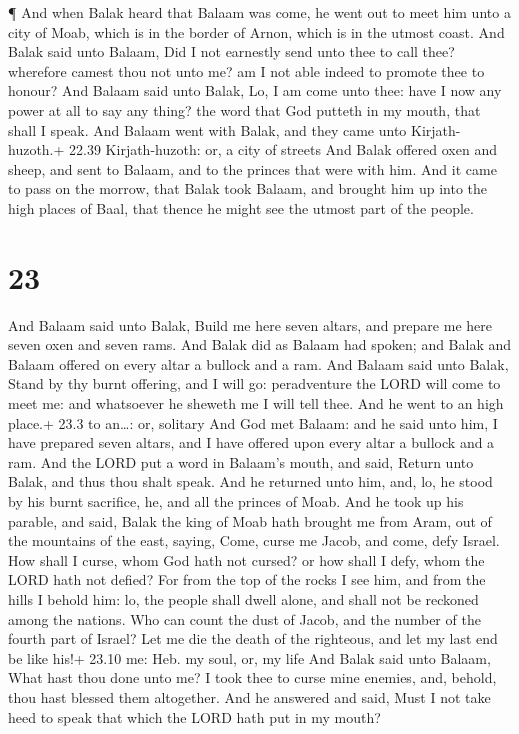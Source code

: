  ¶ And when Balak heard that Balaam was come, he went out
to meet him unto a city of Moab, which is in the border of Arnon, which
is in the utmost coast.  And Balak said unto Balaam, Did I
not earnestly send unto thee to call thee? wherefore camest thou not
unto me? am I not able indeed to promote thee to honour? 
And Balaam said unto Balak, Lo, I am come unto thee: have I now any
power at all to say any thing? the word that God putteth in my mouth,
that shall I speak.  And Balaam went with Balak, and they
came unto Kirjath-huzoth.+ 22.39 Kirjath-huzoth: or, a city of streets
 And Balak offered oxen and sheep, and sent to Balaam, and
to the princes that were with him.  And it came to pass on
the morrow, that Balak took Balaam, and brought him up into the high
places of Baal, that thence he might see the utmost part of the people.

\hypertarget{section-22}{%
\section{23}\label{section-22}}

 And Balaam said unto Balak, Build me here seven altars, and
prepare me here seven oxen and seven rams.  And Balak did as
Balaam had spoken; and Balak and Balaam offered on every altar a bullock
and a ram.  And Balaam said unto Balak, Stand by thy burnt
offering, and I will go: peradventure the LORD will come to meet me: and
whatsoever he sheweth me I will tell thee. And he went to an high
place.+ 23.3 to an\ldots: or, solitary  And God met Balaam:
and he said unto him, I have prepared seven altars, and I have offered
upon every altar a bullock and a ram.  And the LORD put a
word in Balaam's mouth, and said, Return unto Balak, and thus thou shalt
speak.  And he returned unto him, and, lo, he stood by his
burnt sacrifice, he, and all the princes of Moab.  And he
took up his parable, and said, Balak the king of Moab hath brought me
from Aram, out of the mountains of the east, saying, Come, curse me
Jacob, and come, defy Israel.  How shall I curse, whom God
hath not cursed? or how shall I defy, whom the LORD hath not defied?
 For from the top of the rocks I see him, and from the hills
I behold him: lo, the people shall dwell alone, and shall not be
reckoned among the nations.  Who can count the dust of
Jacob, and the number of the fourth part of Israel? Let me die the death
of the righteous, and let my last end be like his!+ 23.10 me: Heb. my
soul, or, my life  And Balak said unto Balaam, What hast
thou done unto me? I took thee to curse mine enemies, and, behold, thou
hast blessed them altogether.  And he answered and said,
Must I not take heed to speak that which the LORD hath put in my mouth?

